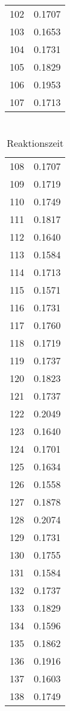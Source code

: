 \begin{multicols}{4}
\begin{table}[H]
\begin{tabular}{|c|r|}
            102 & 0.1707 \\
            103 & 0.1653 \\
            104 & 0.1731 \\
            105 & 0.1829 \\
            106 & 0.1953 \\
            107 & 0.1713 \\
            \hline
        \end{tabular}
    \end{table}
    \columnbreak
    \begin{table}[H]
        \centering
        \begin{tabular}{|c|r|}
            \hline
            108 & 0.1707 \\
            109 & 0.1719 \\
            110 & 0.1749 \\
            111 & 0.1817 \\
            112 & 0.1640 \\
            113 & 0.1584 \\
            114 & 0.1713 \\
            115 & 0.1571 \\
            116 & 0.1731 \\
            117 & 0.1760 \\
            118 & 0.1719 \\
            119 & 0.1737 \\
            120 & 0.1823 \\
            121 & 0.1737 \\
            122 & 0.2049 \\
            123 & 0.1640 \\
            124 & 0.1701 \\
            125 & 0.1634 \\
            126 & 0.1558 \\
            127 & 0.1878 \\
            128 & 0.2074 \\
            129 & 0.1731 \\
            130 & 0.1755 \\
            131 & 0.1584 \\
            132 & 0.1737 \\
            133 & 0.1829 \\
            134 & 0.1596 \\
            135 & 0.1862 \\
            136 & 0.1916 \\
            137 & 0.1603 \\
            138 & 0.1749 \\
            \hline
        \end{tabular}
        \caption{\\Reaktionszeit}
    \end{table}
    
\end{multicols}